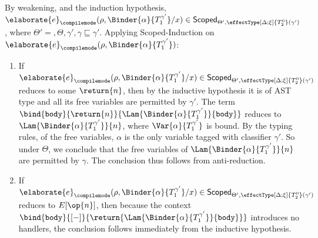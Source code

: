  By weakening, and the induction hypothesis, $\elaborate{e}_{\compilemode}({\rho, \Binder{\alpha}{T_1^{\gamma'}} / x}) \in \scoped[\Theta']{\effectType[\Delta; \xi]{T_2^{0}} (\gamma')}$, where $\Theta' = , \Theta, \gamma', \gamma \sqsubseteq \gamma'$. Applying \textsf{Scoped}-Induction on $\elaborate{e}_{\compilemode}({\rho, \Binder{\alpha}{T_1^{\gamma'}}})$:
\begin{enumerate}
  \item If $\elaborate{e}_{\compilemode}({\rho, \Binder{\alpha}{T_1^{\gamma'}} / x}) \in \scoped[\Theta']{\effectType[\Delta; \xi]{T_2^{0}} (\gamma')}$ reduces to some $\return{n}$, then by the inductive hypothesis it is of AST type and all its free variables are permitted by $\gamma'$. The term $\bind{\texttt{body}}{\return{n}}{\Lam{\Binder{\alpha}{T_1^{\gamma'}}}{\texttt{body}}}$ reduces to $\Lam{\Binder{\alpha}{T_1^{\gamma'}}}{n}$, where $\Var{\alpha}{T_1^{\gamma'}}$ is bound. By the typing rules, of the free variables, $\alpha$ is the only variable tagged with classifier $\gamma'$. So under $\Theta$, we conclude that the free variables of $\Lam{\Binder{\alpha}{T_1^{\gamma'}}}{n}$ are permitted by $\gamma$. The conclusion thus follows from anti-reduction.
  \item If $\elaborate{e}_{\compilemode}({\rho, \Binder{\alpha}{T_1^{\gamma'}} / x}) \in \scoped[\Theta']{\effectType[\Delta; \xi]{T_2^{0}} (\gamma')}$ reduces to $E[\op{n}]$, then because the context $\bind{\texttt{body}}{[-]}{\return{\Lam{\Binder{\alpha}{T_1^{\gamma'}}}{\texttt{body}}}}$ introduces no handlers, the conclusion follows immediately from the inductive hypothesis.
\end{enumerate}

